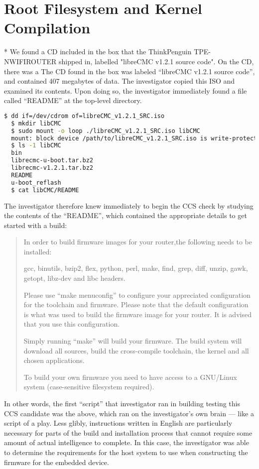 \section{Root Filesystem and Kernel Compilation}

* We found a CD included in the box that the ThinkPenguin TPE-NWIFIROUTER
  shipped in, labelled "libreCMC v1.2.1 source code".  On the CD, there was a
The CD found in the box was labeled ``libreCMC v1.2.1 source code'', and
contained 407 megabytes of data.  The investigator copied this ISO and
examined its contents.   Upon doing so, the investigator immediately found a
file called ``README'' at the top-level directory.

\lstset{tabsize=2}
\begin{lstlisting}[language=bash]
  $ dd if=/dev/cdrom of=libreCMC_v1.2.1_SRC.iso
  $ mkdir libCMC
  $ sudo mount -o loop ./libreCMC_v1.2.1_SRC.iso libCMC
  mount: block device /path/to/libreCMC_v1.2.1_SRC.iso is write-protected, mounting read-only
  $ ls -1 libCMC
  bin
  librecmc-u-boot.tar.bz2
  librecmc-v1.2.1.tar.bz2
  README
  u-boot_reflash
  $ cat libCMC/README
\end{lstlisting}
\label{thinkpenguin-toplevel-readme}
The investigator therefore knew immediately to begin the CCS check by
studying the contents of the ``README'', which contained the appropriate
details to get started with a build:
\begin{quotation}

In order to build firmware images for your router,the following needs to be
installed:

gcc, binutils, bzip2, flex, python, perl, make, find, grep, diff, unzip,
gawk, getopt, libz-dev and libc headers.

Please use ``make menuconfig'' to configure your appreciated configuration
for the toolchain and firmware. Please note that the default configuration is
what was used to build the firmware image for your router. It is advised that
you use this configuration.

Simply running ``make'' will build your firmware.  The build system will
download all sources, build the cross-compile toolchain, the kernel and all
chosen applications.

To build your own firmware you need to have access to a GNU/Linux system
(case-sensitive filesystem required).
\end{quotation}

In other words, the first ``script'' that investigator ran in building
testing this CCS candidate was the above, which ran on the investigator's own
brain --- like a script of a play.  Less glibly, instructions written in
English are particularly necessary for parts of the build and installation
process that cannot require some amount of actual intelligence to complete.
In this case, the investigator was able to determine the requirements for the
host system to use when constructing the firmware for the embedded device.

